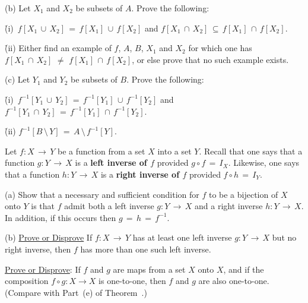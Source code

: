 \V

        (b) Let $X_{1}$ and $X_{2}$ be subsets of $A$. Prove the following:

        \h (i)\, $f[X_{1}\,{\cup}\,X_{2}] \,=\, f[X_{1}]\,{\cup}\,f[X_{2}]$ and
           $f[X_{1}\,{\cap}\,X_{2}] \,{\subseteq}\, f[X_{1}]\,{\cap}\,f[X_{2}]$.

        \h (ii) Either find an example of $f$, $A$, $B$, $X_{1}$ and $X_{2}$ for which one has
    $f[X_{1}\,{\cap}\,X_{2}]  \,\,{\neq}\,\, f[X_{1}]\,{\cap}\,f[X_{2}]$, or else prove that no such example exists.


\V

        (c) Let $Y_{1}$ and $Y_{2}$ be subsets of $B$. Prove the following:

        \h (i)\, $f^{-1}[Y_{1}\,{\cup}\,Y_{2}] \,=\, f^{-1}[Y_{1}]\,{\cup}\,f^{-1}[Y_{2}]$ and $f^{-1}[Y_{1}\,{\cap}\,Y_{2}] \,=\, f^{-1}[Y_{1}]\,{\cap}\,f^{-1}[Y_{2}]$.

        \h (ii) $f^{-1}[B\,{\setminus}\,Y] \,=\, A\,{\setminus}\,f^{-1}[Y]$.


\V
\V

\noindent \ExAi Let $f:X \,{\rightarrow}\, Y$ be a function from a set $X$ into a set $Y$.
    Recall that one says that a function $g:Y\,{\rightarrow}\,X$ is a {\bf left inverse of $f$} provided $g{\circ}f\,=\, I_{X}$.
        Likewise, one says that a function $h:Y\,{\rightarrow}\,X$ is a {\bf right inverse of $f$} provided $f{\circ}h\,=\, I_{Y}$.

\V        
      (a) Show that a necessary and sufficient condition for $f$ to be a bijection of $X$ onto $Y$ is that $f$ admit both a left inverse $g:Y\,{\rightarrow}\,X$ and a right inverse $h:Y\,{\rightarrow}\,X$.
      In addition, if this occurs then $g\,=\,h\,=\,f^{-1}$.
      
\V

      (b) \underline{Prove or Disprove} If $f:X\,{\rightarrow}\,Y$ has at least one left inverse $g:Y\,{\rightarrow}\,X$ but no right inverse,  then $f$ has more than one  such left inverse.

\V
\V

\noindent \ExAj \underline{Prove or Disprove}: If $f$ and $g$ are maps from a set $X$ onto $X$,
    and if the composition $f{\circ}g:X {\rightarrow} X$ is one-to-one, then $f$ and $g$ are also one-to-one. (Compare with Part~(e) of Theorem~.)

